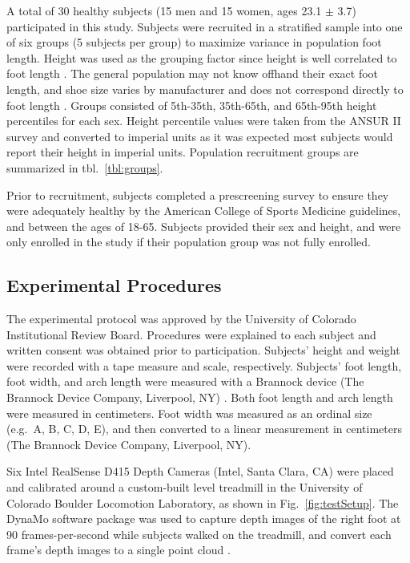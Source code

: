 \documentclass[preprint]{elsarticle}
\begin{document}
A total of 30 healthy subjects (15 men and 15 women, ages 23.1 \(\pm\) 3.7) participated in this study.
Subjects were recruited in a stratified sample into one of six groups (5 subjects per group) to maximize variance in population foot length.
Height was used as the grouping factor since height is well correlated to foot length \citep{Giles1991}. The general population may not know offhand their exact foot length, and shoe size varies by manufacturer and does not correspond directly to foot length \citep{Jurca2013, Wannop2019}. Groups consisted of 5th-35th, 35th-65th, and 65th-95th height percentiles for each sex.
Height percentile values were taken from the ANSUR II survey \citep{Gordon2014} and converted to imperial units as it was expected most subjects would report their height in imperial units.
Population recruitment groups are summarized in tbl.~\ref{tbl:groups}.

Prior to recruitment, subjects completed a prescreening survey to ensure they were adequately healthy by the American College of Sports Medicine guidelines\citep{Riebe2015}, and between the ages of 18-65.
Subjects provided their sex and height, and were only enrolled in the study if their population group was not fully enrolled.

\hypertarget{experimental-procedures}{%
\subsection{Experimental Procedures}\label{experimental-procedures}}

The experimental protocol was approved by the University of Colorado Institutional Review Board.
Procedures were explained to each subject and written consent was obtained prior to participation.
Subjects' height and weight were recorded with a tape measure and scale, respectively.
Subjects' foot length, foot width, and arch length were measured with a Brannock device (The Brannock Device Company, Liverpool, NY) \citep{ASTM2017}.
Both foot length and arch length were measured in centimeters.
Foot width was measured as an ordinal size (e.g.~A, B, C, D, E), and then converted to a linear measurement in centimeters (The Brannock Device Company, Liverpool, NY).

Six Intel RealSense D415 Depth Cameras (Intel, Santa Clara, CA) were placed and calibrated around a custom-built level treadmill in the University of Colorado Boulder Locomotion Laboratory, as shown in Fig.~\ref{fig:testSetup}.
The DynaMo software package was used to capture depth images of the right foot at 90 frames-per-second while subjects walked on the treadmill, and convert each frame's depth images to a single point cloud \citep{Boppana2019}.
\end{document}
